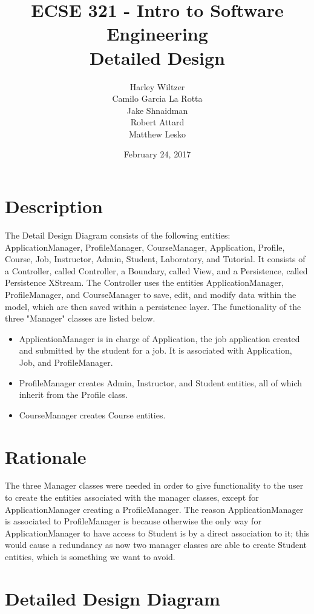 \documentclass[12pt]{article}
\title{ECSE 321 - Intro to Software Engineering\\Detailed Design}
\author{Harley Wiltzer\\Camilo Garcia La Rotta\\Jake Shnaidman\\Robert Attard\\Matthew Lesko}
\date{February 24, 2017}
\begin{document}
\maketitle
\newpage
{} %
\tableofcontents
\section{Description}
The Detail Design Diagram consists of the following entities: ApplicationManager, ProfileManager, CourseManager, Application, Profile, Course, Job, Instructor, Admin, Student, Laboratory, and Tutorial. It consists of a Controller, called Controller, a Boundary, called View, and a Persistence, called Persistence XStream. The Controller uses the entities ApplicationManager, ProfileManager, and CourseManager to save, edit, and modify data within the model, which are then saved within a persistence layer. The functionality of the three "Manager" classes are listed below.
\begin{itemize}
	\item ApplicationManager is in charge of Application, the job application created and submitted by the student for a job. It is associated with Application, Job, and ProfileManager.
	\item ProfileManager creates Admin, Instructor, and Student entities, all of which inherit from the Profile class.
	\item CourseManager creates Course entities.
\end{itemize}
\section{Rationale}
The three Manager classes were needed in order to give functionality to the user to create the entities associated with the manager classes, except for ApplicationManager creating a ProfileManager. The reason ApplicationManager is associated to ProfileManager is because otherwise the only way for ApplicationManager to have access to Student is by a direct association to it; this would cause a redundancy as now two manager classes are able to create Student entities, which is something we want to avoid.
\section{Detailed Design Diagram}
\end{document}
